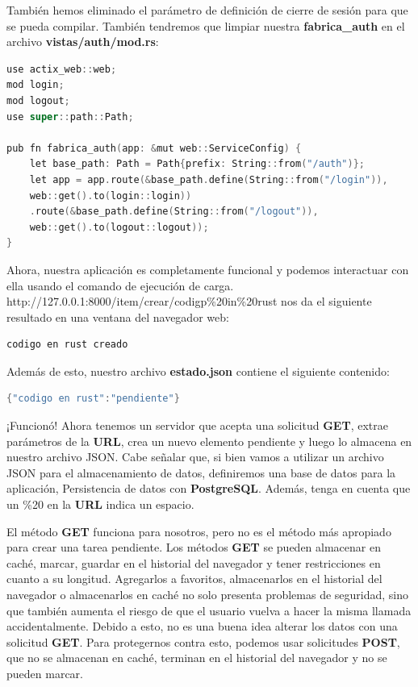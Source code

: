 También hemos eliminado el parámetro de definición de cierre de sesión para que se pueda compilar. También tendremos que limpiar nuestra \textbf{fabrica\_auth} en el archivo \textbf{vistas/auth/mod.rs}:

\begin{lstlisting}[language=C]
use actix_web::web;
mod login;
mod logout;
use super::path::Path;

pub fn fabrica_auth(app: &mut web::ServiceConfig) {
	let base_path: Path = Path{prefix: String::from("/auth")};
	let app = app.route(&base_path.define(String::from("/login")),
	web::get().to(login::login))
	.route(&base_path.define(String::from("/logout")),
	web::get().to(logout::logout));
}
\end{lstlisting}

Ahora, nuestra aplicación es completamente funcional y podemos interactuar con ella usando el comando de ejecución de carga. http://127.0.0.1:8000/item/crear/codigp\%20in\%20rust nos da el siguiente resultado en una ventana del navegador web:

\begin{lstlisting}[language=C]
codigo en rust creado
\end{lstlisting}

Además de esto, nuestro archivo \textbf{estado.json} contiene el siguiente contenido:

\begin{lstlisting}[language=C]
{"codigo en rust":"pendiente"}
\end{lstlisting}

¡Funcionó! Ahora tenemos un servidor que acepta una solicitud \textbf{GET}, extrae parámetros de la \textbf{URL}, crea un nuevo elemento pendiente y luego lo almacena en nuestro archivo JSON. Cabe señalar que, si bien vamos a utilizar un archivo JSON para el almacenamiento de datos, definiremos una base de datos para la aplicación, Persistencia de datos con \textbf{PostgreSQL}. Además, tenga en cuenta que un \%20 en la \textbf{URL} indica un espacio.

El método \textbf{GET} funciona para nosotros, pero no es el método más apropiado para crear una tarea pendiente. Los métodos \textbf{GET} se pueden almacenar en caché, marcar, guardar en el historial del navegador y tener restricciones en cuanto a su longitud. Agregarlos a favoritos, almacenarlos en el historial del navegador o almacenarlos en caché no solo presenta problemas de seguridad, sino que también aumenta el riesgo de que el usuario vuelva a hacer la misma llamada accidentalmente. Debido a esto, no es una buena idea alterar los datos con una solicitud \textbf{GET}. Para protegernos contra esto, podemos usar solicitudes \textbf{POST}, que no se almacenan en caché, terminan en el historial del navegador y no se pueden marcar.

